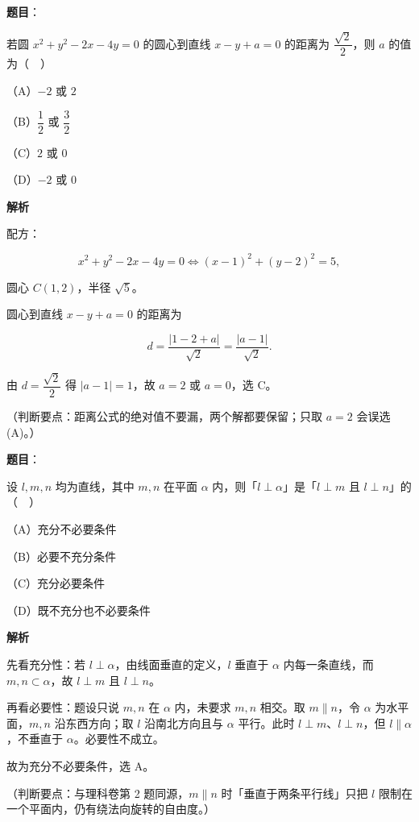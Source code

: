 \begin{answer}

\textbf{题目}：

若圆 $x^2+y^2-2x-4y=0$ 的圆心到直线 $x-y+a=0$ 的距离为 $\dfrac{\sqrt2}{2}$，则 $a$ 的值为（　）

（A）$-2$ 或 $2$

（B）$\dfrac12$ 或 $\dfrac32$

（C）$2$ 或 $0$

（D）$-2$ 或 $0$

\textbf{解析}

配方：

\nopagebreak[4]
\[x^2+y^2-2x-4y=0\iff (x-1)^2+(y-2)^2=5,\]

圆心 $C(1,2)$，半径 $\sqrt5$。

圆心到直线 $x-y+a=0$ 的距离为

\nopagebreak[4]
\[d=\frac{|1-2+a|}{\sqrt2}=\frac{|a-1|}{\sqrt2}.\]

由 $d=\dfrac{\sqrt2}{2}$ 得 $|a-1|=1$，故 $a=2$ 或 $a=0$，选 C。

（判断要点：距离公式的绝对值不要漏，两个解都要保留；只取 $a=2$ 会误选 (A)。）


\end{answer}
\begin{answer}

\textbf{题目}：

设 $l,m,n$ 均为直线，其中 $m,n$ 在平面 $\alpha$ 内，则「$l\perp\alpha$」是「$l\perp m$ 且 $l\perp n$」的（　）

（A）充分不必要条件

（B）必要不充分条件

（C）充分必要条件

（D）既不充分也不必要条件

\textbf{解析}

先看充分性：若 $l\perp\alpha$，由线面垂直的定义，$l$ 垂直于 $\alpha$ 内每一条直线，而 $m,n\subset\alpha$，故 $l\perp m$ 且 $l\perp n$。

再看必要性：题设只说 $m,n$ 在 $\alpha$ 内，未要求 $m,n$ 相交。取 $m\parallel n$，令 $\alpha$ 为水平面，$m,n$ 沿东西方向；取 $l$ 沿南北方向且与 $\alpha$ 平行。此时 $l\perp m$、$l\perp n$，但 $l\parallel\alpha$，不垂直于 $\alpha$。必要性不成立。

故为充分不必要条件，选 A。

（判断要点：与理科卷第 2 题同源，$m\parallel n$ 时「垂直于两条平行线」只把 $l$ 限制在一个平面内，仍有绕法向旋转的自由度。）


\end{answer}
